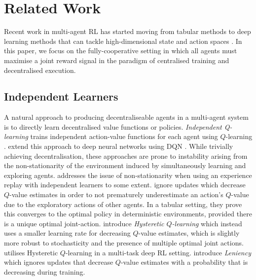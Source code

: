 \documentclass[twoside,11pt]{article}
\renewcommand{\cite}{\citep}
\begin{document}
 \section{Related Work}
\label{sec:related}

Recent work in multi-agent RL has started moving from 
tabular methods \cite{yang_multiagent_2004, busoniu_comprehensive_2008} to deep learning methods that can tackle
high-dimensional state and action spaces \cite{tampuu_multiagent_2015,foerster_counterfactual_2017,peng_multiagent_2017, de_witt_multi-agent_2018}.
In this paper, we 
focus on the fully-cooperative setting in which all agents must maximise a joint reward signal in the paradigm of centralised training and decentralised execution.  

\subsection{Independent Learners}
A natural approach to producing decentraliseable agents in a multi-agent system 
is to directly learn decentralised value functions or policies. 
\emph{Independent Q-learning} \cite{tan_multi-agent_1993} trains independent
action-value functions for each agent using $Q$-learning \cite{watkins_learning_1989}. \citet{tampuu_multiagent_2015} extend this approach to 
deep neural networks using DQN \cite{mnih_human-level_2015}.
While trivially achieving decentralisation, these approaches are prone to instability arising from the non-stationarity of the environment induced by simultaneously learning and exploring agents. 
\citet{foerster_stabilising_2017} addresses the issue of non-stationarity when using an experience replay with independent learners to some extent.
\citet{lauer2000algorithm} ignore updates which decrease $Q$-value estimates in order to not prematurely underestimate an action's $Q$-value due to the exploratory actions of other agents. In a tabular setting, they prove this converges to the optimal policy in deterministic environments, provided there is a unique optimal joint-action.
\citet{matignon2007hysteretic} introduce \textit{Hysteretic $Q$-learning} which instead uses a smaller learning rate for decreasing $Q$-value estimates, which is slightly more robust to stochasticity and the presence of multiple optimal joint actions. 
\citet{omidshafiei_deep_2017} utilises Hysteretic $Q$-learning in a multi-task deep RL setting. 
\citet{panait2008theoretical} introduce \textit{Leniency} which ignores updates that decrease $Q$-value estimates with a probability that is decreasing during training. 
\end{document}
